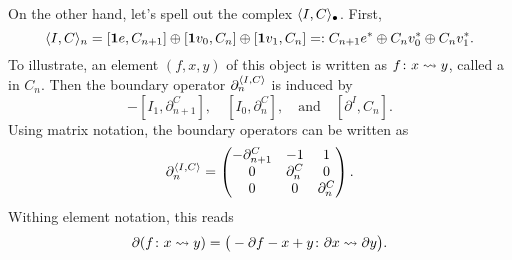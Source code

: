 {On the other hand, let's spell out the complex 
$\langle I,C\rangle_{\bullet}$. First,
\[
\langle I,C\rangle_{n}=
[\mathbf{1}{e},C_{n+1}]\oplus[\mathbf{1}{v_0},C_n]\oplus[\mathbf{1}{v_1},C_n]=:
C_{n+1}{e^{\ast}}\oplus C_n{v_0^{\ast}}\oplus C_n{v_1^{\ast}}.
\]
To illustrate, an element $(f,x,y)$ of this object is written as 
$f\colon x\rightsquigarrow y$, called a  in $C_{n}$. 
Then the boundary operator $\partial^{\langle I,C\rangle}_n$ is induced by 
\[
-[I_1,\partial^C_{n+1}],\quad
[I_0,\partial^C_{n}],\quad\text{and}\quad
[\partial^I,C_n].
\]
Using matrix notation, the boundary operators can be written as
\[
\partial^{\langle I,C\rangle}_n=
\begin{pmatrix}
-\partial^C_{n+1} & -1 & 1 \\
0 & \partial^C_n & 0 \\
0 & 0 & \partial^C_n
\end{pmatrix}.
\]
Withing element notation, this reads
\[
\partial(f\colon x\rightsquigarrow y) = 
\big(-\partial f - x + y \colon 
\partial x\rightsquigarrow\partial y\big).
\]

}

